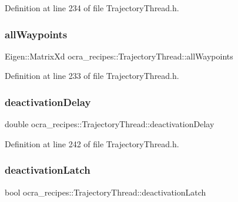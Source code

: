 Definition at line 234 of file Trajectory\+Thread.\+h.

\hypertarget{classocra__recipes_1_1TrajectoryThread_a857686d75878a7ae4edf12e37fddb10c}{}\label{classocra__recipes_1_1TrajectoryThread_a857686d75878a7ae4edf12e37fddb10c} 
\subsubsection{\texorpdfstring{all\+Waypoints}{allWaypoints}}
{\footnotesize\ttfamily Eigen\+::\+Matrix\+Xd ocra\+\_\+recipes\+::\+Trajectory\+Thread\+::all\+Waypoints\hspace{0.3cm}{\ttfamily [protected]}}



Definition at line 233 of file Trajectory\+Thread.\+h.

\hypertarget{classocra__recipes_1_1TrajectoryThread_a98ffdc4593f0608e8355654b54191c21}{}\label{classocra__recipes_1_1TrajectoryThread_a98ffdc4593f0608e8355654b54191c21} 
\subsubsection{\texorpdfstring{deactivation\+Delay}{deactivationDelay}}
{\footnotesize\ttfamily double ocra\+\_\+recipes\+::\+Trajectory\+Thread\+::deactivation\+Delay\hspace{0.3cm}{\ttfamily [protected]}}



Definition at line 242 of file Trajectory\+Thread.\+h.

\hypertarget{classocra__recipes_1_1TrajectoryThread_a5bdb397e0f051c99e563074946e01a82}{}\label{classocra__recipes_1_1TrajectoryThread_a5bdb397e0f051c99e563074946e01a82} 
\subsubsection{\texorpdfstring{deactivation\+Latch}{deactivationLatch}}
{\footnotesize\ttfamily bool ocra\+\_\+recipes\+::\+Trajectory\+Thread\+::deactivation\+Latch\hspace{0.3cm}{\ttfamily [protected]}}



